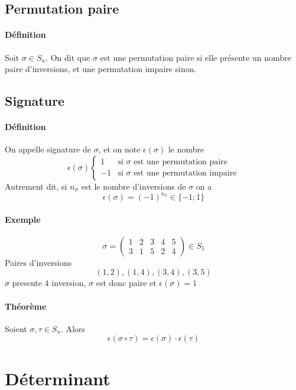 %
\subsection{Permutation paire}
%
\paragraph{Définition} Soit $\sigma \in S_n$. On dit que $\sigma$ est une permutation paire si elle présente un nombre paire d'inversions, et une permutation impaire sinon.

%
\subsection{Signature}
%
\paragraph{Définition} On appelle signature de $\sigma$, et on note $\epsilon(\sigma)$ le nombre
$$\epsilon(\sigma) \left\{ \begin{array}{lr} 
  1 & \text{si } \sigma \text{ est une permutation paire} \\ 
  -1 & \text{si } \sigma \text{ est une permutation impaire} 
\end{array} \right.$$
Autrement dit, si $n_{\sigma}$ est le nombre d'inversions de $\sigma$ on a
$$\epsilon(\sigma) = (-1)^{n_{\sigma}} \in \{-1; 1\}$$

\paragraph{Exemple}
$$\sigma = \begin{pmatrix} 1 & 2 & 3 & 4 & 5 \\ 3 & 1 & 5 & 2 & 4 \end{pmatrix} \in S_5$$
Paires d'inversions
$$(1, 2), (1, 4), (3, 4), (3, 5)$$
$\sigma$ presente $4$ inversion, $\sigma$ est donc paire et $\epsilon(\sigma) = 1$

\paragraph{Théorème} Soient $\sigma, \tau \in S_n$. Alors
$$\epsilon(\sigma \circ \tau) = \epsilon(\sigma) \cdot \epsilon(\tau)$$

%
%
\section{Déterminant}
%
%

